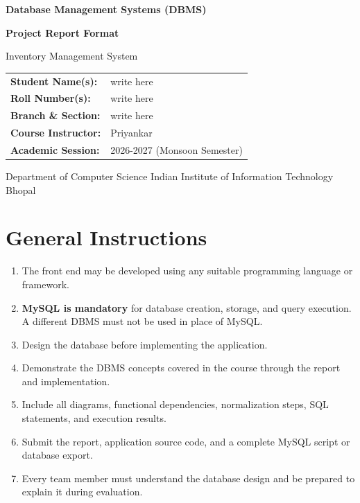 \documentclass[12pt,a4paper]{report}
\newcommand{\projecttitle}{Inventory Management System}
\newcommand{\coursename}{Database Management Systems (DBMS)}
\begin{document}
\begin{titlepage}
    \centering
    \vspace*{1.5cm}
    {\Large \textbf{\coursename}\par}
    \vspace{1.5cm}
    {\Huge \bfseries Project Report Format\par}
    \vspace{0.7cm}
    {\LARGE \projecttitle\par}
    \vspace{1.8cm}

    \begin{tabular}{>{\bfseries}p{5cm} p{7cm}}
        Student Name(s): & write here \\[0.7cm]
        Roll Number(s): & write here \\[0.7cm]
        Branch \&  Section: & write here \\[0.7cm]
        Course Instructor: & Priyankar \\[0.7cm]
        Academic Session: & 2026-2027 (Monsoon Semester)
    \end{tabular}

    \vfill
    {\large Department of Computer Science}
    \vspace{0.3cm}
    {\large Indian Institute of Information Technology Bhopal}
    \vspace{1cm}
\end{titlepage}

\tableofcontents
\clearpage

\chapter*{General Instructions}

\begin{enumerate}
    \item The front end may be developed using any suitable programming language or framework.
    \item \textbf{MySQL is mandatory} for database creation, storage, and query execution. A different DBMS must not be used in place of MySQL.
    \item Design the database before implementing the application.
    \item Demonstrate the DBMS concepts covered in the course through the report and implementation.
    \item Include all diagrams, functional dependencies, normalization steps, SQL statements, and execution results.
    \item Submit the report, application source code, and a complete MySQL script or database export.
    \item Every team member must understand the database design and be prepared to explain it during evaluation.
\end{enumerate}
\end{document}
